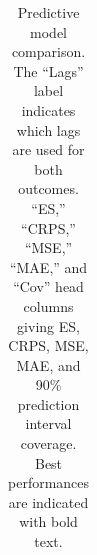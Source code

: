 \documentclass[alpha-refs]{wiley-article}
\begin{document}
\begin{table}[H]
\begin{tabular}{lllrrrrrrrrrr}
   \hline
\end{tabular}
\caption{Predictive model comparison. The ``Lags'' label indicates which lags are used for both outcomes. ``ES,'' ``CRPS,'' ``MSE,'' ``MAE,'' and ``Cov'' head columns giving ES, CRPS, MSE, MAE, and 90\% prediction interval coverage. Best performances are indicated with bold text.
}\label{tab:mod_comp}
\end{table}
\end{document}
